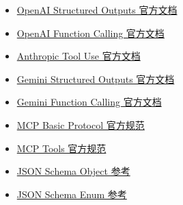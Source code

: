 \documentclass[9pt,a4paper,twocolumn]{ctexart}
\begin{document}
\begin{itemize}[itemsep=1pt, topsep=2pt]
  \item \href{https://platform.openai.com/docs/guides/structured-outputs}{OpenAI Structured Outputs 官方文档}
  \item \href{https://platform.openai.com/docs/guides/function-calling}{OpenAI Function Calling 官方文档}
  \item \href{https://platform.claude.com/docs/en/agents-and-tools/tool-use/overview}{Anthropic Tool Use 官方文档}
  \item \href{https://ai.google.dev/gemini-api/docs/structured-output}{Gemini Structured Outputs 官方文档}
  \item \href{https://ai.google.dev/gemini-api/docs/function-calling}{Gemini Function Calling 官方文档}
  \item \href{https://modelcontextprotocol.io/specification/2025-06-18/basic}{MCP Basic Protocol 官方规范}
  \item \href{https://modelcontextprotocol.io/specification/2025-06-18/server/tools}{MCP Tools 官方规范}
  \item \href{https://json-schema.org/understanding-json-schema/reference/object}{JSON Schema Object 参考}
  \item \href{https://json-schema.org/understanding-json-schema/reference/enum}{JSON Schema Enum 参考}
\end{itemize}
\end{document}
